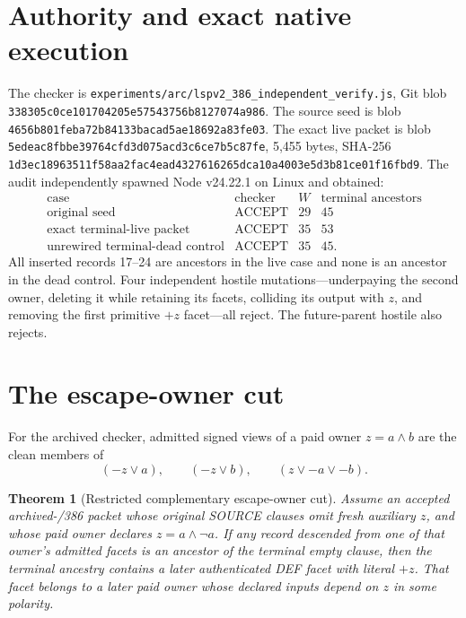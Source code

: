 \documentclass[11pt]{article}
\newtheorem{theorem}{Theorem}
\begin{document}
\section*{Authority and exact native execution}
The checker is
\texttt{experiments/arc/lspv2\_386\_independent\_verify.js}, Git blob
\texttt{338305c0ce101704205e57543756b8127074a986}. The source seed is blob
\texttt{4656b801feba72b84133bacad5ae18692a83fe03}. The exact live packet is
blob \texttt{5edeac8fbbe39764cfd3d075acd3c6ce7b5c87fe}, 5,455 bytes, SHA-256
\texttt{1d3ec18963511f58aa2fac4ead4327616265dca10a4003e5d3b81ce01f16fbd9}.
The audit independently spawned Node v24.22.1 on Linux and obtained:
\[
\begin{array}{l|c|c|c}
\text{case}&\text{checker}&W&\text{terminal ancestors}\\\hline
\text{original seed}&\mathrm{ACCEPT}&29&45\\
\text{exact terminal-live packet}&\mathrm{ACCEPT}&35&53\\
\text{unrewired terminal-dead control}&\mathrm{ACCEPT}&35&45.
\end{array}
\]
All inserted records 17--24 are ancestors in the live case and none is an
ancestor in the dead control. Four independent hostile mutations---underpaying
the second owner, deleting it while retaining its facets, colliding its output
with $z$, and removing the first primitive $+z$ facet---all reject. The
future-parent hostile also rejects.

\section*{The escape-owner cut}
For the archived checker, admitted signed views of a paid owner
$z=a\wedge b$ are the clean members of
\[
  (-z\vee a),\qquad(-z\vee b),\qquad(z\vee-a\vee-b).
\]

\begin{theorem}[Restricted complementary escape-owner cut]
Assume an accepted archived-/386 packet whose original SOURCE clauses omit
fresh auxiliary $z$, and whose paid owner declares $z=a\wedge\neg a$.
If any record descended from one of that owner's admitted facets is an ancestor
of the terminal empty clause, then the terminal ancestry contains a later
authenticated DEF facet with literal $+z$. That facet belongs to a later paid
owner whose declared inputs depend on $z$ in some polarity.
\end{theorem}
\end{document}
